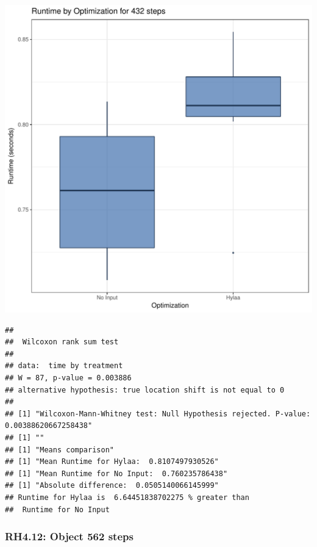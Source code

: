 \documentclass{article}\usepackage[]{graphicx}\usepackage[]{color}
\makeatletter
\def\maxwidth{ %
  \ifdim\Gin@nat@width>\linewidth
    \linewidth
  \else
    \Gin@nat@width
  \fi
}
\newenvironment{kframe}{%
 \def\at@end@of@kframe{}%
 \ifinner\ifhmode%
  \def\at@end@of@kframe{\end{minipage}}%
  \begin{minipage}{\columnwidth}%
 \fi\fi%
 \def\FrameCommand##1{\hskip\@totalleftmargin \hskip-\fboxsep
 \colorbox{shadecolor}{##1}\hskip-\fboxsep
     \hskip-\linewidth \hskip-\@totalleftmargin \hskip\columnwidth}%
 \MakeFramed {\advance\hsize-\width
   \@totalleftmargin\z@ \linewidth\hsize
   \@setminipage}}%
 {\par\unskip\endMakeFramed%
 \at@end@of@kframe}
\newenvironment{knitrout}{}{} %
\makeatother
\begin{document}
\begin{knitrout}
\color{fgcolor}
\includegraphics[width=\maxwidth]{figure/RH4_steps432-1} 
\begin{kframe}\begin{verbatim}
## 
## 	Wilcoxon rank sum test
## 
## data:  time by treatment
## W = 87, p-value = 0.003886
## alternative hypothesis: true location shift is not equal to 0
## 
## [1] "Wilcoxon-Mann-Whitney test: Null Hypothesis rejected. P-value: 0.00388620667258438"
## [1] ""
## [1] "Means comparison"
## [1] "Mean Runtime for Hylaa:  0.8107497930526"
## [1] "Mean Runtime for No Input:  0.760235786438"
## [1] "Absolute difference:  0.0505140066145999"
## Runtime for Hylaa is  6.64451838702275 % greater than 
##  Runtime for No Input
\end{verbatim}
\end{kframe}
\end{knitrout}


\subsubsection{RH4.12: Object 562 steps}
\end{document}

